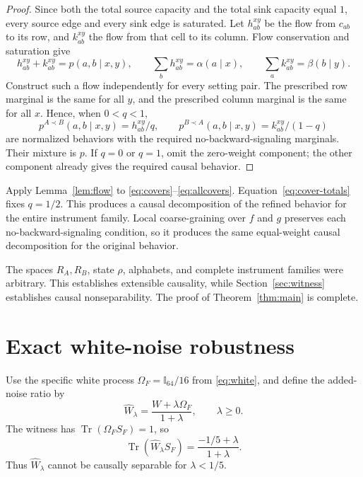 \documentclass[11pt,letterpaper]{article}
\theoremstyle{remark}\newtheorem{remark}[theorem]{Remark}
\newcommand{\Tr}{\operatorname{Tr}}
\newcommand{\I}{\mathbb I}
\begin{document}
\begin{proof}
Since both the total source capacity and the total sink capacity equal $1$, every source edge and every sink edge is saturated. Let $h_{ab}^{xy}$ be the flow from $c_{ab}$ to its row, and $k_{ab}^{xy}$ the flow from that cell to its column. Flow conservation and saturation give
\begin{equation}\label{eq:flow-identities}
 h_{ab}^{xy}+k_{ab}^{xy}=p(a,b\mid x,y),\qquad
 \sum_bh_{ab}^{xy}=\alpha(a\mid x),\qquad
 \sum_ak_{ab}^{xy}=\beta(b\mid y).
\end{equation}
Construct such a flow independently for every setting pair. The prescribed row marginal is the same for all $y$, and the prescribed column marginal is the same for all $x$. Hence, when $0<q<1$,
\[
 p^{A\prec B}(a,b\mid x,y)=h_{ab}^{xy}/q,
 \qquad
 p^{B\prec A}(a,b\mid x,y)=k_{ab}^{xy}/(1-q)
\]
are normalized behaviors with the required no-backward-signaling marginals. Their mixture is $p$. If $q=0$ or $q=1$, omit the zero-weight component; the other component already gives the required causal behavior.
\end{proof}

Apply Lemma~\ref{lem:flow} to \eqref{eq:covers}--\eqref{eq:allcovers}. Equation~\eqref{eq:cover-totals} fixes $q=1/2$. This produces a causal decomposition of the refined behavior for the entire instrument family. Local coarse-graining over $f$ and $g$ preserves each no-backward-signaling condition, so it produces the same equal-weight causal decomposition for the original behavior.

The spaces $R_A,R_B$, state $\rho$, alphabets, and complete instrument families were arbitrary. This establishes extensible causality, while Section~\ref{sec:witness} establishes causal nonseparability. The proof of Theorem~\ref{thm:main} is complete.

\section{Exact white-noise robustness}\label{sec:robustness}

Use the specific white process $\Omega_F=\I_{64}/16$ from \eqref{eq:white}, and define the added-noise ratio by
\begin{equation}\label{eq:robustness-def}
 \widehat W_\lambda=\frac{W+\lambda\Omega_F}{1+\lambda},
 \qquad \lambda\ge0.
\end{equation}
The witness has $\Tr(\Omega_FS_F)=1$, so
\[
 \Tr(\widehat W_\lambda S_F)=\frac{-1/5+\lambda}{1+\lambda}.
\]
Thus $\widehat W_\lambda$ cannot be causally separable for $\lambda<1/5$.
\end{document}
